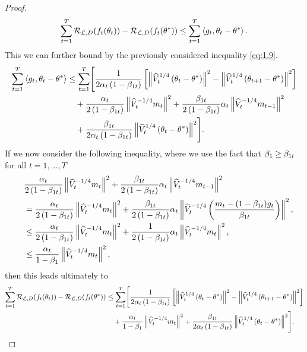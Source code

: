 \begin{proof}
\begin{align*}
\sum_{t=1}^T \operatorname{\mathcal{R}}_{\operatorname{\mathcal{L}}, D}(f_t(\theta_t)) - \operatorname{\mathcal{R}}_{\operatorname{\mathcal{L}}, D}(f_t(\theta^{\ast}))\leq \sum_{t=1}^T \left\langle g_t, \theta_t - \theta^{\ast} \right\rangle.
\end{align*}
This we can further bound by the previously considered inequality \eqref{eq:1.9}.
\begin{align*}
\sum_{t=1}^T \left\langle g_t, \theta_t - \theta^{\ast} \right\rangle &\leq\sum_{t=1}^T \Biggl[ \frac{1}{2\alpha_t\left(1-\beta_{1t}\right)} \left[\left\| \widehat{V}_t^{1/4} \left( \theta_t - \theta^{\ast} \right) \right\|^2 - \left\| \widehat{V}_t^{1/4}\left(\theta_{t+1} - \theta^{\ast} \right) \right\|^2 \right] \\
&\quad +\frac{\alpha_t}{2\left(1-\beta_{1t}\right)} \left\| \widehat{V}_t^{-1/4} m_t \right\|^2 + \frac{\beta_{1t}}{2\left(1-\beta_{1t}\right)} \alpha_t \left\| \widehat{V}_t^{-1/4} m_{t-1}\right\|^2\\
&\quad + \frac{\beta_{1t}}{2\alpha_t \left( 1-\beta_{1t} \right)} \left\| \widehat{V}_t^{1/4}\left(\theta_t -\theta^{\ast} \right) \right\|^2 \Biggr].
\end{align*}
If we now consider the following inequality, where we use the fact that $\beta_1\geq \beta_{1t}$ for all $t=1,\ldots,T$
\begin{align*}
&\frac{\alpha_t}{2\left(1-\beta_{1t}\right)} \left\| \widehat{V}_t^{-1/4} m_t \right\|^2 + \frac{\beta_{1t}}{2\left(1-\beta_{1t}\right)} \alpha_t \left\| \widehat{V}_t^{-1/4} m_{t-1}\right\|^2\\
\quad &= \frac{\alpha_t}{2\left(1-\beta_{1t}\right)} \left\| \widehat{V}_t^{-1/4} m_t \right\|^2 + \frac{\beta_{1t}}{2\left(1-\beta_{1t}\right)} \alpha_t \left\| \widehat{V}_t^{-1/4} \left(\frac{m_{t} - (1-\beta_{1t})g_t}{\beta_{1t}}\right)\right\|^2,\\
\quad &\leq \frac{\alpha_t}{2\left(1-\beta_{1t}\right)} \left\| \widehat{V}_t^{-1/4} m_t \right\|^2 + \frac{1}{2\left(1-\beta_{1t}\right)} \alpha_t \left\| \widehat{V}_t^{-1/4} m_{t}\right\|^2,\\
\quad &\leq \frac{\alpha_t}{1-\beta_{1}} \left\| \widehat{V}_t^{-1/4} m_t \right\|^2,
\end{align*}
then this leads ultimately to
\begin{align}\label{eq:1.10}
\sum_{t=1}^T \risk_{\loss, D}(f_t(\t_t)) - \risk_{\loss, D}(f_t(\t^{\ast})) &\leq \sum_{t=1}^T \Biggl[ \frac{1}{2\a_t\left(1-\b_{1t}\right)} \left[\left\| \hat{V}_t^{1/4} \left( \t_t - \t^{\ast} \right) \right\|^2 - \left\| \hat{V}_t^{1/4}\left(\t_{t+1} - \t^{\ast} \right) \right\|^2 \right] \nonumber\\
&\quad +\frac{\a_t}{1-\b_{1}} \left\| \hat{V}_t^{-1/4} m_t \right\|^2 + \frac{\b_{1t}}{2\a_t \left( 1-\b_{1t} \right)} \left\| \hat{V}_t^{1/4}\left(\t_t -\t^{\ast} \right) \right\|^2 \Biggr].

\end{align}
\end{proof}
